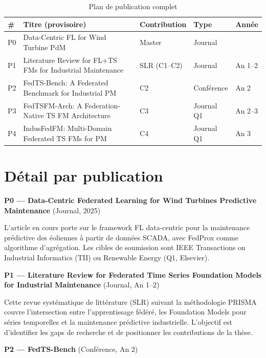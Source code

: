 \documentclass[12pt, a4paper]{report}
\begin{document}
\begin{table}[h!]
\centering
\caption{Plan de publication complet}
\label{tab:publication-plan}
\renewcommand{\arraystretch}{1.6}
\begin{tabularx}{\textwidth}{>{\centering\arraybackslash}p{0.8cm}X>{\centering\arraybackslash}p{2.8cm}>{\centering\arraybackslash}p{2.2cm}>{\centering\arraybackslash}p{1.8cm}}
\toprule
\textbf{\#} & \textbf{Titre (provisoire)} & \textbf{Contribution} & \textbf{Type} & \textbf{Année} \\
\midrule
P0 & Data-Centric FL for Wind Turbine PdM & Master & Journal & 2025 \\
P1 & Literature Review for FL+TS FMs for Industrial Maintenance & SLR (C1--C2) & Journal & An 1--2 \\
P2 & FedTS-Bench: A Federated Benchmark for Industrial PM & C2 & Conférence & An 2 \\
P3 & FedTSFM-Arch: A Federation-Native TS FM Architecture & C3 & Journal Q1 & An 2--3 \\
P4 & IndusFedFM: Multi-Domain Federated TS FMs for PM & C4 & Journal Q1 & An 3 \\
\bottomrule
\end{tabularx}
\end{table}

\section{Détail par publication}

\textbf{P0 — Data-Centric Federated Learning for Wind Turbines Predictive Maintenance} (Journal, 2025)

L'article en cours porte sur le framework FL data-centric pour la maintenance prédictive
des éoliennes à partir de données SCADA, avec FedProx comme algorithme d'agrégation.
Les cibles de soumission sont IEEE Transactions on Industrial Informatics (TII) ou
Renewable Energy (Q1, Elsevier).

\textbf{P1 — Literature Review for Federated Time Series Foundation Models for Industrial Maintenance} (Journal, An 1--2)

Cette revue systématique de littérature (SLR) suivant la méthodologie PRISMA couvre
l'intersection entre l'apprentissage fédéré, les Foundation Models pour séries temporelles
et la maintenance prédictive industrielle. L'objectif est d'identifier les gaps de recherche
et de positionner les contributions de la thèse.

\textbf{P2 — FedTS-Bench} (Conférence, An 2)
\end{document}
